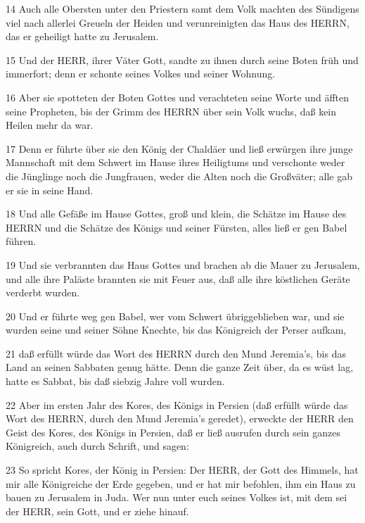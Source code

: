 \par 14 Auch alle Obersten unter den Priestern samt dem Volk machten des Sündigens viel nach allerlei Greueln der Heiden und verunreinigten das Haus des HERRN, das er geheiligt hatte zu Jerusalem.
\par 15 Und der HERR, ihrer Väter Gott, sandte zu ihnen durch seine Boten früh und immerfort; denn er schonte seines Volkes und seiner Wohnung.
\par 16 Aber sie spotteten der Boten Gottes und verachteten seine Worte und äfften seine Propheten, bis der Grimm des HERRN über sein Volk wuchs, daß kein Heilen mehr da war.
\par 17 Denn er führte über sie den König der Chaldäer und ließ erwürgen ihre junge Mannschaft mit dem Schwert im Hause ihres Heiligtums und verschonte weder die Jünglinge noch die Jungfrauen, weder die Alten noch die Großväter; alle gab er sie in seine Hand.
\par 18 Und alle Gefäße im Hause Gottes, groß und klein, die Schätze im Hause des HERRN und die Schätze des Königs und seiner Fürsten, alles ließ er gen Babel führen.
\par 19 Und sie verbrannten das Haus Gottes und brachen ab die Mauer zu Jerusalem, und alle ihre Paläste brannten sie mit Feuer aus, daß alle ihre köstlichen Geräte verderbt wurden.
\par 20 Und er führte weg gen Babel, wer vom Schwert übriggeblieben war, und sie wurden seine und seiner Söhne Knechte, bis das Königreich der Perser aufkam,
\par 21 daß erfüllt würde das Wort des HERRN durch den Mund Jeremia's, bis das Land an seinen Sabbaten genug hätte. Denn die ganze Zeit über, da es wüst lag, hatte es Sabbat, bis daß siebzig Jahre voll wurden.
\par 22 Aber im ersten Jahr des Kores, des Königs in Persien (daß erfüllt würde das Wort des HERRN, durch den Mund Jeremia's geredet), erweckte der HERR den Geist des Kores, des Königs in Persien, daß er ließ ausrufen durch sein ganzes Königreich, auch durch Schrift, und sagen:
\par 23 So spricht Kores, der König in Persien: Der HERR, der Gott des Himmels, hat mir alle Königreiche der Erde gegeben, und er hat mir befohlen, ihm ein Haus zu bauen zu Jerusalem in Juda. Wer nun unter euch seines Volkes ist, mit dem sei der HERR, sein Gott, und er ziehe hinauf.



